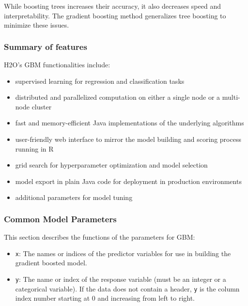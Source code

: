 \documentclass[11pt]{article}
\begin{document}
{While boosting trees increases their accuracy, it also decreases speed and interpretability. The gradient boosting method generalizes tree boosting to minimize these issues. 

\subsubsection{Summary of features} 
H2O's GBM functionalities include:

\begin{itemize}

\item supervised learning for regression and classification tasks

\item distributed and parallelized computation on either a single node or a multi-node cluster

\item fast and memory-efficient Java implementations of the underlying algorithms

\item user-friendly web interface to mirror the model building and scoring process running in R

\item grid search for hyperparameter optimization and model selection

\item model export in plain Java code for deployment in production environments

\item additional parameters for model tuning

\end{itemize}

\subsubsection{Common Model Parameters}

This section describes the functions of the parameters for GBM: 

\begin{itemize}

\item {\texttt{x}}: The names or indices of the predictor variables for use in building the gradient boosted model. 

\item {\texttt{y}}: The name or index of the response variable (must be an integer or a categorical variable). If the data does not contain a header, {\texttt{y}} is the column index number starting at 0 and increasing from left to right. 


\end{itemize}}
\end{document}
